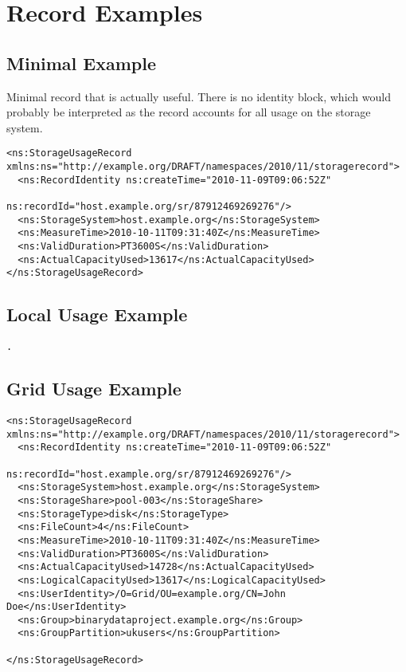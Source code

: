 
\section{Record Examples}
\label{sec:record-examples}


\subsection{Minimal Example}

Minimal record that is actually useful. There is no identity block, which would
probably be interpreted as the record accounts for all usage on the storage
system.

\begin{verbatim}
<ns:StorageUsageRecord xmlns:ns="http://example.org/DRAFT/namespaces/2010/11/storagerecord">
  <ns:RecordIdentity ns:createTime="2010-11-09T09:06:52Z"
                     ns:recordId="host.example.org/sr/87912469269276"/>
  <ns:StorageSystem>host.example.org</ns:StorageSystem>
  <ns:MeasureTime>2010-10-11T09:31:40Z</ns:MeasureTime>
  <ns:ValidDuration>PT3600S</ns:ValidDuration>
  <ns:ActualCapacityUsed>13617</ns:ActualCapacityUsed>
</ns:StorageUsageRecord>
\end{verbatim}


\subsection{Local Usage Example}


\begin{verbatim}
.
\end{verbatim}



\subsection{Grid Usage Example}

\begin{verbatim}
<ns:StorageUsageRecord xmlns:ns="http://example.org/DRAFT/namespaces/2010/11/storagerecord">
  <ns:RecordIdentity ns:createTime="2010-11-09T09:06:52Z"
                     ns:recordId="host.example.org/sr/87912469269276"/>
  <ns:StorageSystem>host.example.org</ns:StorageSystem>
  <ns:StorageShare>pool-003</ns:StorageShare>
  <ns:StorageType>disk</ns:StorageType>
  <ns:FileCount>4</ns:FileCount>
  <ns:MeasureTime>2010-10-11T09:31:40Z</ns:MeasureTime>
  <ns:ValidDuration>PT3600S</ns:ValidDuration>
  <ns:ActualCapacityUsed>14728</ns:ActualCapacityUsed>
  <ns:LogicalCapacityUsed>13617</ns:LogicalCapacityUsed>
  <ns:UserIdentity>/O=Grid/OU=example.org/CN=John Doe</ns:UserIdentity>
  <ns:Group>binarydataproject.example.org</ns:Group>
  <ns:GroupPartition>ukusers</ns:GroupPartition>

</ns:StorageUsageRecord>

\end{verbatim}


